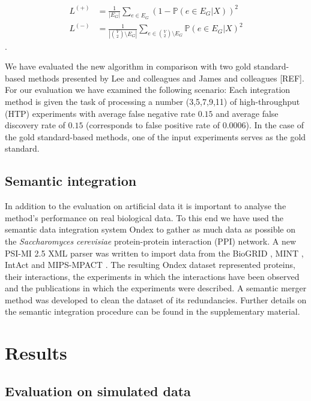 \documentclass{bioinfo}
\newcommand{\prob}{\mathbb{P}}
\newcommand{\species}[1]{\textit{#1}}
\newcommand{\REF}{{\color{red}[REF]}}
\begin{document}
\begin{methods}
\begin{align} 
	L^{(+)} &= \frac{1}{|E_G|}\sum_{e \in E_G} (1 - \prob(e \in E_G|X))^2\\
	L^{(-)} &= \frac{1}{|\binom{V}{2} \setminus E_G|}\sum_{e \in \binom{V}{2} \setminus E_G} \prob(e \in E_G|X)^2
\end{align}.

We have evaluated the new algorithm in comparison with two gold standard-based methods presented by Lee and colleagues \citep{lee_probabilistic_2004} and James and colleagues \REF. For our evaluation we have examined the following scenario: Each integration method is given the task of processing a number (3,5,7,9,11) of high-throughput (HTP) experiments with average false negative rate $0.15$ and average false discovery rate of $0.15$ (corresponds to false positive rate of 0.0006). In the case of the gold standard-based methods, one of the input experiments serves as the gold standard.

\subsection{Semantic integration}

In addition to the evaluation on artificial data it is important to analyse the method's performance on real biological data. To this end we have used the semantic data integration system Ondex \citep{koehler_graph-based_2006} to gather as much data as possible on the \species{Saccharomyces cerevisiae} protein-protein interaction (PPI) network. A new PSI-MI 2.5 XML \citep{kerrien_broadening_2007} parser was written to import data from the BioGRID \citep{breitkreutz_biogrid_2008}, MINT \citep{chatr-aryamontri_mint:_2007}, IntAct \citep{hermjakob_intact:_2004} and MIPS-MPACT \citep{guldener_mpact:_2006}. The resulting Ondex dataset represented proteins, their interactions, the experiments in which the interactions have been observed and the publications in which the experiments were described. A semantic merger method was developed to clean the dataset of its redundancies. Further details on the semantic integration procedure can be found in the supplementary material.

\end{methods}

\section{Results}

\subsection{Evaluation on simulated data}
\end{document}
